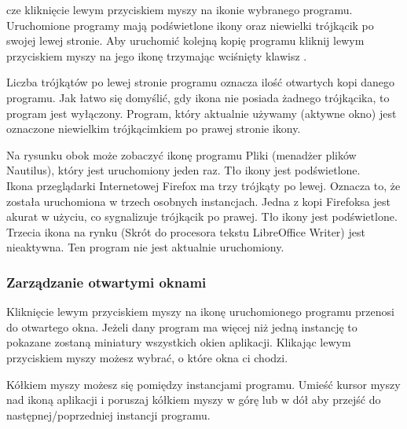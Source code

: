 cze kliknięcie lewym przyciskiem myszy na ikonie wybranego programu. Uruchomione programy mają podświetlone ikony oraz niewielki trójkącik po swojej lewej stronie. Aby uruchomić kolejną kopię programu kliknij lewym przyciskiem myszy na jego ikonę trzymając wciśnięty klawisz .

\noindent Liczba trójkątów po lewej stronie programu oznacza ilość otwartych kopi danego programu. Jak łatwo się domyślić, gdy ikona nie posiada żadnego trójkącika, to program jest wyłączony. Program, który aktualnie używamy (aktywne okno) jest oznaczone niewielkim trójkącimkiem po prawej stronie ikony.

\noindent Na rysunku obok może zobaczyć ikonę programu Pliki (menadżer plików Nautilus), który jest uruchomiony jeden raz. Tło ikony jest podświetlone.\\
Ikona przeglądarki Internetowej Firefox ma trzy trójkąty po lewej. Oznacza to, że została uruchomiona w trzech osobnych instancjach. Jedna z kopi Firefoksa jest akurat w użyciu, co sygnalizuje trójkącik po prawej. Tło ikony jest podświetlone.\\
Trzecia ikona na rynku (Skrót do procesora tekstu LibreOffice Writer) jest nieaktywna. Ten program nie jest aktualnie uruchomiony.

\subsubsection{Zarządzanie otwartymi oknami}
Kliknięcie lewym przyciskiem myszy na ikonę uruchomionego programu przenosi do otwartego okna. Jeżeli dany program ma więcej niż jedną instancję to pokazane zostaną miniatury wszystkich okien aplikacji. Klikając lewym przyciskiem myszy możesz wybrać, o które okna ci chodzi. 

Kółkiem myszy możesz się pomiędzy instancjami programu. Umieść kursor myszy nad ikoną aplikacji i poruszaj kółkiem myszy w górę lub w dół aby przejść do następnej/poprzedniej instancji programu.


